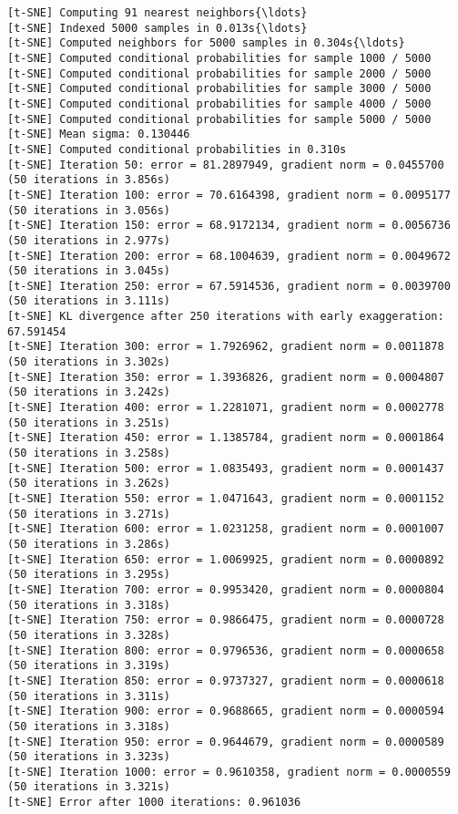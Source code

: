 \documentclass[11pt]{article}
\begin{document}
    \begin{Verbatim}[commandchars=\\\{\}]
[t-SNE] Computing 91 nearest neighbors{\ldots}
[t-SNE] Indexed 5000 samples in 0.013s{\ldots}
[t-SNE] Computed neighbors for 5000 samples in 0.304s{\ldots}
[t-SNE] Computed conditional probabilities for sample 1000 / 5000
[t-SNE] Computed conditional probabilities for sample 2000 / 5000
[t-SNE] Computed conditional probabilities for sample 3000 / 5000
[t-SNE] Computed conditional probabilities for sample 4000 / 5000
[t-SNE] Computed conditional probabilities for sample 5000 / 5000
[t-SNE] Mean sigma: 0.130446
[t-SNE] Computed conditional probabilities in 0.310s
[t-SNE] Iteration 50: error = 81.2897949, gradient norm = 0.0455700 (50 iterations in 3.856s)
[t-SNE] Iteration 100: error = 70.6164398, gradient norm = 0.0095177 (50 iterations in 3.056s)
[t-SNE] Iteration 150: error = 68.9172134, gradient norm = 0.0056736 (50 iterations in 2.977s)
[t-SNE] Iteration 200: error = 68.1004639, gradient norm = 0.0049672 (50 iterations in 3.045s)
[t-SNE] Iteration 250: error = 67.5914536, gradient norm = 0.0039700 (50 iterations in 3.111s)
[t-SNE] KL divergence after 250 iterations with early exaggeration: 67.591454
[t-SNE] Iteration 300: error = 1.7926962, gradient norm = 0.0011878 (50 iterations in 3.302s)
[t-SNE] Iteration 350: error = 1.3936826, gradient norm = 0.0004807 (50 iterations in 3.242s)
[t-SNE] Iteration 400: error = 1.2281071, gradient norm = 0.0002778 (50 iterations in 3.251s)
[t-SNE] Iteration 450: error = 1.1385784, gradient norm = 0.0001864 (50 iterations in 3.258s)
[t-SNE] Iteration 500: error = 1.0835493, gradient norm = 0.0001437 (50 iterations in 3.262s)
[t-SNE] Iteration 550: error = 1.0471643, gradient norm = 0.0001152 (50 iterations in 3.271s)
[t-SNE] Iteration 600: error = 1.0231258, gradient norm = 0.0001007 (50 iterations in 3.286s)
[t-SNE] Iteration 650: error = 1.0069925, gradient norm = 0.0000892 (50 iterations in 3.295s)
[t-SNE] Iteration 700: error = 0.9953420, gradient norm = 0.0000804 (50 iterations in 3.318s)
[t-SNE] Iteration 750: error = 0.9866475, gradient norm = 0.0000728 (50 iterations in 3.328s)
[t-SNE] Iteration 800: error = 0.9796536, gradient norm = 0.0000658 (50 iterations in 3.319s)
[t-SNE] Iteration 850: error = 0.9737327, gradient norm = 0.0000618 (50 iterations in 3.311s)
[t-SNE] Iteration 900: error = 0.9688665, gradient norm = 0.0000594 (50 iterations in 3.318s)
[t-SNE] Iteration 950: error = 0.9644679, gradient norm = 0.0000589 (50 iterations in 3.323s)
[t-SNE] Iteration 1000: error = 0.9610358, gradient norm = 0.0000559 (50 iterations in 3.321s)
[t-SNE] Error after 1000 iterations: 0.961036

    \end{Verbatim}
\end{document}
